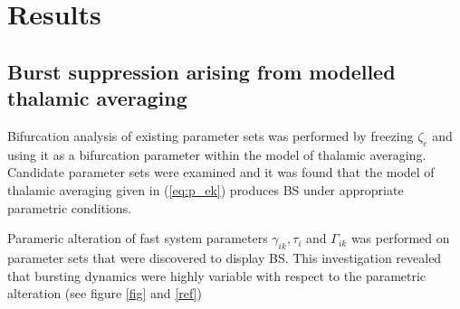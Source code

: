 \documentclass[a4paper,12pt]{article}
\begin{document}
\section{Results}

\subsection{Burst suppression arising from modelled thalamic averaging}
Bifurcation analysis of existing parameter sets was performed by freezing $\zeta_e$ and using it as a bifurcation parameter within the model of thalamic averaging. Candidate parameter sets were examined and it was found that the model of thalamic averaging given in (\ref{eq:p_ek}) produces BS under appropriate parametric conditions. 

Parameric alteration of fast system parameters $\gamma_{ik}, \tau_i$ and $\Gamma_{ik}$ was performed on parameter sets that were discovered to display BS. This investigation revealed that bursting dynamics were highly variable with respect to the parametric alteration (see figure \ref{fig} and \ref{ref})
\end{document}
